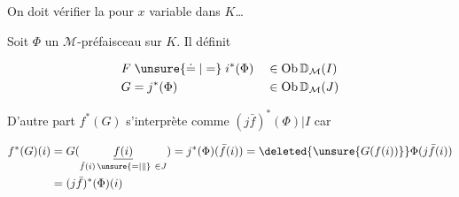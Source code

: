 On doit vérifier la  pour $x$ variable dans $K$\ldots

Soit $\Phi$ un $\mathcal M$-préfaisceau sur $K$. Il définit

\[
\begin{aligned}
F&\mathrel{\unsure{\doteq|=}}i^*(\Phi)&&\in\mathrm{Ob}\,\mathbb D_{\mathcal M}(I)\\
G&=j^*(\Phi)&&\in\mathrm{Ob}\,\mathbb D_{\mathcal M}(J)
\end{aligned}
\]

D'autre part $f^*(G)$ s'interprète comme $(j\bar f)^*(\Phi)|I$ car

\[
\begin{aligned}
f^*(G)(i)&=G(\underset{\bar f(i)\,\unsure{=|\parallel}\ \in J}{\underline{f(i)}})
 =j^*(\Phi)(\bar f(i))=\deleted{\unsure{G(f(i))}}\Phi(j\bar f(i))\\
&=(j\bar f)^*(\Phi)(i)
\end{aligned}
\]
